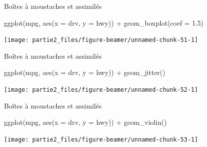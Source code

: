 \documentclass[12pt,ignorenonframetext,]{beamer}
\newenvironment{Shaded}{}{}
\newcommand{\DataTypeTok}[1]{#1}
\newcommand{\FloatTok}[1]{#1}
\newcommand{\KeywordTok}[1]{\textcolor[rgb]{0.00,0.00,1.00}{#1}}
\newcommand{\NormalTok}[1]{#1}
\newcommand{\OperatorTok}[1]{#1}
\newcommand{\StringTok}[1]{\textcolor[rgb]{0.00,0.50,0.50}{#1}}
\renewenvironment{Shaded}{\begin{snugshade}}{\end{snugshade}}
\begin{document}
\begin{frame}[fragile]{Boîtes à moustaches et assimilés}
\protect\hypertarget{boites-a-moustaches-et-assimiles}{}

\footnotesize \center

\begin{Shaded}
\begin{Highlighting}[]
\KeywordTok{ggplot}\NormalTok{(mpg, }\KeywordTok{aes}\NormalTok{(}\DataTypeTok{x =}\NormalTok{ drv, }\DataTypeTok{y =}\NormalTok{ hwy)) }\OperatorTok{+}\StringTok{ }
\StringTok{  }\KeywordTok{geom_boxplot}\NormalTok{(}\DataTypeTok{coef =} \FloatTok{1.5}\NormalTok{)}
\end{Highlighting}
\end{Shaded}

\texttt{[image: partie2\_files/figure-beamer/unnamed-chunk-51-1]}

\end{frame}

\begin{frame}[fragile]{Boîtes à moustaches et assimilés}
\protect\hypertarget{boites-a-moustaches-et-assimiles-1}{}

\footnotesize \center

\begin{Shaded}
\begin{Highlighting}[]
\KeywordTok{ggplot}\NormalTok{(mpg, }\KeywordTok{aes}\NormalTok{(}\DataTypeTok{x =}\NormalTok{ drv, }\DataTypeTok{y =}\NormalTok{ hwy)) }\OperatorTok{+}\StringTok{ }
\StringTok{  }\KeywordTok{geom_jitter}\NormalTok{()}
\end{Highlighting}
\end{Shaded}

\texttt{[image: partie2\_files/figure-beamer/unnamed-chunk-52-1]}

\end{frame}

\begin{frame}[fragile]{Boîtes à moustaches et assimilés}
\protect\hypertarget{boites-a-moustaches-et-assimiles-2}{}

\footnotesize \center

\begin{Shaded}
\begin{Highlighting}[]
\KeywordTok{ggplot}\NormalTok{(mpg, }\KeywordTok{aes}\NormalTok{(}\DataTypeTok{x =}\NormalTok{ drv, }\DataTypeTok{y =}\NormalTok{ hwy)) }\OperatorTok{+}\StringTok{ }
\StringTok{  }\KeywordTok{geom_violin}\NormalTok{()}
\end{Highlighting}
\end{Shaded}

\texttt{[image: partie2\_files/figure-beamer/unnamed-chunk-53-1]}

\end{frame}
\end{document}
